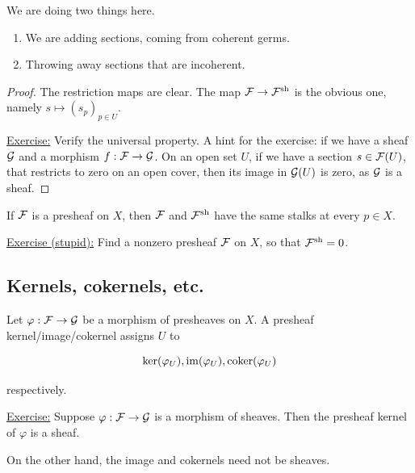 \documentclass{article}
\begin{document}
We are doing two things here. 

\begin{enumerate}
    \item We are adding sections, coming from coherent germs.
    \item Throwing away sections that are incoherent.
\end{enumerate}

\begin{proof}
    The restriction maps are clear. The map \(\mathcal{F} \to \mathcal{F}^{\operatorname{sh}}\) is the obvious one, namely \(s \mapsto (s_p)_{p \in U}\).

    \underline{Exercise:} Verify the universal property. A hint for the exercise: if we have a sheaf \(\mathcal{G}\) and a morphism \(f : \mathcal{F} \to \mathcal{G}\). On an open set \(U\), if we have a section \(s \in \mathcal{F}(U)\), that restricts to zero on an open cover, then its image in \(\mathcal{G}(U)\) is zero, as \(\mathcal{G}\) is a sheaf.
\end{proof}

\begin{corollary}
     If \(\mathcal{F}\) is a presheaf on \(X\), then \(\mathcal{F}\) and \(\mathcal{F}^{\operatorname{sh}}\) have the same stalks at every \(p \in X\).
\end{corollary}

\underline{Exercise (stupid):} Find a nonzero presheaf \(\mathcal{F}\) on \(X\), so that \(\mathcal{F}^{\operatorname{sh}} = 0\).

\subsection{Kernels, cokernels, etc.}

Let \(\varphi : \mathcal{F} \to \mathcal{G}\) be a morphism of presheaves on \(X\). A presheaf kernel/image/cokernel assigns \(U\) to 

\[\ker(\varphi_U), \operatorname{im}(\varphi_U), \operatorname{coker}(\varphi_U)\] 

respectively.

\underline{Exercise:} Suppose \(\varphi : \mathcal{F} \to \mathcal{G}\) is a morphism of sheaves. Then the presheaf kernel of \(\varphi\) is a sheaf.

On the other hand, the image and cokernels need not be sheaves.
\end{document}
